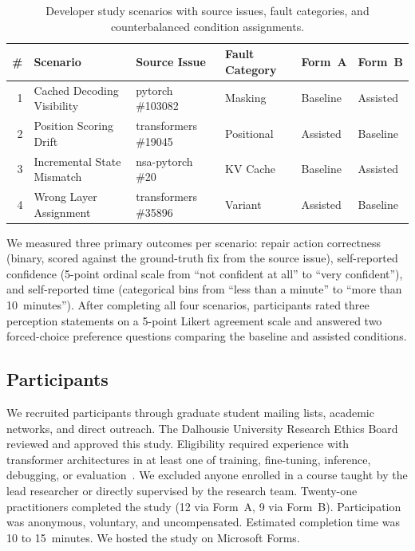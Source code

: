 \begin{table}[!htbp]
\centering
\caption{Developer study scenarios with source issues, fault categories, and counterbalanced condition assignments.}
\label{tab:devstudy_scenarios}
\small
\begin{tabular}{@{}r l l l l l@{}}
\toprule
\textbf{\#} & \textbf{Scenario} & \textbf{Source Issue} & \textbf{Fault Category} & \textbf{Form~A} & \textbf{Form~B} \\
\midrule
1 & Cached Decoding Visibility  & pytorch \#103082       & Masking     & Baseline  & Assisted \\
2 & Position Scoring Drift      & transformers \#19045   & Positional  & Assisted  & Baseline \\
3 & Incremental State Mismatch  & nsa-pytorch \#20       & KV Cache    & Baseline  & Assisted \\
4 & Wrong Layer Assignment      & transformers \#35896   & Variant     & Assisted  & Baseline \\
\bottomrule
\end{tabular}
\end{table}

We measured three primary outcomes per scenario: repair action correctness (binary, scored against the ground-truth fix from the source issue), self-reported confidence (5-point ordinal scale from ``not confident at all'' to ``very confident''), and self-reported time (categorical bins from ``less than a minute'' to ``more than 10~minutes''). After completing all four scenarios, participants rated three perception statements on a 5-point Likert agreement scale and answered two forced-choice preference questions comparing the baseline and assisted conditions.


\subsection{Participants}
\label{sec:defaultpp_devstudy_participants}

We recruited participants through graduate student mailing lists, academic networks, and direct outreach. The Dalhousie University Research Ethics Board reviewed and approved this study. Eligibility required experience with transformer architectures in at least one of training, fine-tuning, inference, debugging, or evaluation~\cite{umlaut,kunit}. We excluded anyone enrolled in a course taught by the lead researcher or directly supervised by the research team. Twenty-one practitioners completed the study (12 via Form~A, 9 via Form~B). Participation was anonymous, voluntary, and uncompensated. Estimated completion time was 10 to 15~minutes. We hosted the study on Microsoft Forms.

